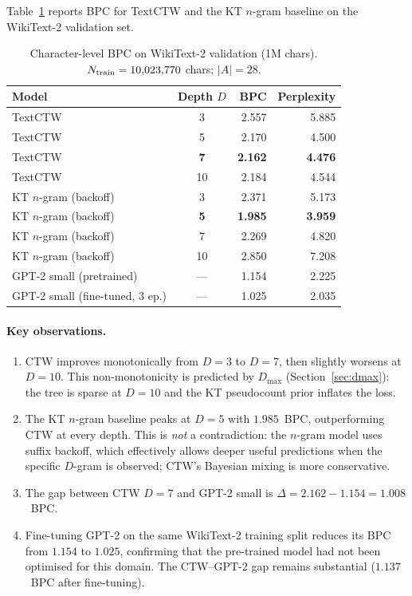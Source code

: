 \documentclass[11pt,a4paper]{article}
\begin{document}
Table~\ref{tab:char_results} reports BPC for TextCTW and the KT $n$-gram
baseline on the WikiText-2 validation set.

\begin{table}[H]
\centering
\caption{Character-level BPC on WikiText-2 validation (1M chars).
$N_{\rm train} = 10{,}023{,}770$ chars; $|A|=28$.}
\label{tab:char_results}
{\small
\begin{tabular}{lcrr}
\toprule
\textbf{Model} & \textbf{Depth $D$} & \textbf{BPC} & \textbf{Perplexity}\\
\midrule
TextCTW             & 3  & 2.557 & 5.885 \\
TextCTW             & 5  & 2.170 & 4.500 \\
TextCTW             & \textbf{7}  & \textbf{2.162} & \textbf{4.476} \\
TextCTW             & 10 & 2.184 & 4.544 \\
\midrule
KT $n$-gram (backoff)  & 3  & 2.371 & 5.173 \\
KT $n$-gram (backoff)  & \textbf{5}  & \textbf{1.985} & \textbf{3.959} \\
KT $n$-gram (backoff)  & 7  & 2.269 & 4.820 \\
KT $n$-gram (backoff)  & 10 & 2.850 & 7.208 \\
\midrule
GPT-2 small (pretrained)        & — & 1.154 & 2.225 \\
GPT-2 small (fine-tuned, 3 ep.) & — & 1.025 & 2.035 \\
\bottomrule
\end{tabular}}
\end{table}

\paragraph{Key observations.}
\begin{enumerate}[leftmargin=1.5em]
  \item CTW improves monotonically from $D=3$ to $D=7$, then slightly
        worsens at $D=10$.
        This non-monotonicity is predicted by $D_{\max}$
        (Section~\ref{sec:dmax}): the tree is sparse at $D=10$ and
        the KT pseudocount prior inflates the loss.
  \item The KT $n$-gram baseline peaks at $D=5$ with $1.985$~BPC,
        outperforming CTW at every depth.
        This is \emph{not} a contradiction:
        the $n$-gram model uses suffix backoff, which effectively allows
        deeper useful predictions when the specific $D$-gram is observed;
        CTW's Bayesian mixing is more conservative.
  \item The gap between CTW $D=7$ and GPT-2 small is
        $\Delta = 2.162 - 1.154 = 1.008$~BPC.
  \item Fine-tuning GPT-2 on the same WikiText-2 training split
        reduces its BPC from $1.154$ to $1.025$, confirming that
        the pre-trained model had not been optimised for this domain.
        The CTW--GPT-2 gap remains substantial ($1.137$~BPC after fine-tuning).
\end{enumerate}
\end{document}
